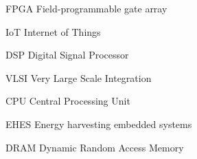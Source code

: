 \begin{basedescript}{\desclabelstyle{\pushlabel}\desclabelwidth{6em}}
\item[{FPGA}] Field-programmable gate array%
\item[{IoT}]Internet of Things%
\item[{DSP}] Digital Signal Processor%
\item[{VLSI}] Very Large Scale Integration%
\item[{CPU}] Central Processing Unit%
\item[{EHES}] Energy harvesting embedded systems%
\item[{DRAM}] Dynamic Random Access Memory%
\end{basedescript}